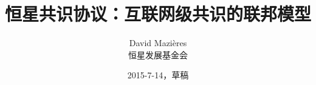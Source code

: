 \documentclass[a4paper,onecolumn,12pt]{article}
\title{恒星共识协议：互联网级共识的联邦模型}
\author{David Mazi{\`e}res\\恒星发展基金会}
\date{2015-7-14，草稿}
\begin{document}
\maketitle












%
\printglossaries



\end{document}
